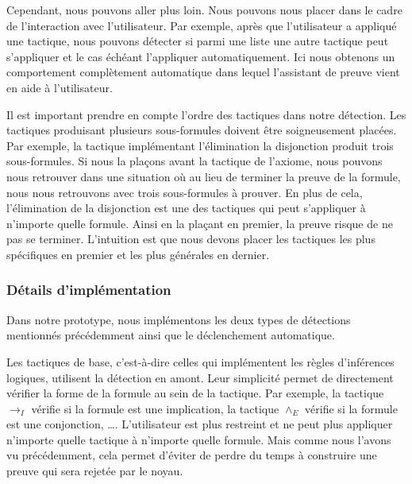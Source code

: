 \documentclass[french,titlepage]{article}
\begin{document}
Cependant, nous pouvons aller plus loin. Nous pouvons nous placer dans le cadre de l'interaction avec l'utilisateur. Par exemple, après que l'utilisateur a appliqué une tactique, nous pouvons détecter si parmi une liste une autre tactique peut s'appliquer et le cas échéant l'appliquer automatiquement. Ici nous obtenons un comportement complètement automatique dans lequel l'assistant de preuve vient en aide à l'utilisateur.

Il est important prendre en compte l'ordre des tactiques dans notre détection. Les tactiques produisant plusieurs sous-formules doivent être soigneusement placées. Par exemple, la tactique implémentant l'élimination la disjonction produit trois sous-formules. Si nous la plaçons avant la tactique de l'axiome, nous pouvons nous retrouver dans une situation où au lieu de terminer la preuve de la formule, nous nous retrouvons avec trois sous-formules à prouver. En plus de cela, l'élimination de la disjonction est une des tactiques qui peut s'appliquer à n'importe quelle formule. Ainsi en la plaçant en premier, la preuve risque de ne pas se terminer. L'intuition est que nous devons placer les tactiques les plus spécifiques en premier et les plus générales en dernier.

\subsubsection{Détails d'implémentation} \label{realisation:detection_declenchement:details_implementation}
Dans notre prototype, nous implémentons les deux types de détections mentionnés précédemment ainsi que le déclenchement automatique.

Les tactiques de base, c'est-à-dire celles qui implémentent les règles d'inférences logiques, utilisent la détection en amont. Leur simplicité permet de directement vérifier la forme de la formule au sein de la tactique. Par exemple, la tactique $\to_I$ vérifie si la formule est une implication, la tactique $\land_E$ vérifie si la formule est une conjonction, \dots. L'utilisateur est plus restreint et ne peut plus appliquer n'importe quelle tactique à n'importe quelle formule. Mais comme nous l'avons vu précédemment, cela permet d'éviter de perdre du temps à construire une preuve qui sera rejetée par le noyau.
\end{document}
